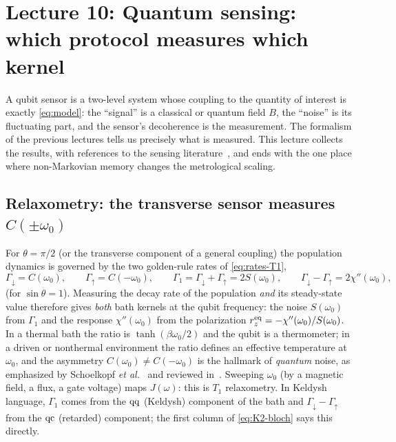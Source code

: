 \section{Lecture 10: Quantum sensing: which protocol measures which kernel}
\label{sec:lec10}

A qubit sensor is a two-level system whose coupling to the quantity of interest is exactly \cref{eq:model}: the ``signal'' is a classical or quantum field $B$, the ``noise'' is its fluctuating part, and the sensor's decoherence is the measurement.
The formalism of the previous lectures tells us precisely what is measured.
This lecture collects the results, with references to the sensing literature~\cite{Degen2017}, and ends with the one place where non-Markovian memory changes the metrological scaling.

\subsection{Relaxometry: the transverse sensor measures \texorpdfstring{$C(\pm\omega_0)$}{C(+-omega0)}}

For $\theta=\pi/2$ (or the transverse component of a general coupling) the population dynamics is governed by the two golden-rule rates of \cref{eq:rates-T1},
\begin{equation}
  \Gamma_\downarrow=C(\omega_0),\qquad \Gamma_\uparrow=C(-\omega_0),\qquad
  \Gamma_1=\Gamma_\downarrow+\Gamma_\uparrow=2S(\omega_0),\qquad
  \Gamma_\downarrow-\Gamma_\uparrow=2\chi''(\omega_0),
\end{equation}
(for $\sin\theta=1$).
Measuring the decay rate of the population \emph{and} its steady-state value therefore gives \emph{both} bath kernels at the qubit frequency: the noise $S(\omega_0)$ from $\Gamma_1$ and the response $\chi''(\omega_0)$ from the polarization $r_z^{\rm eq}=-\chi''(\omega_0)/S(\omega_0)$.
In a thermal bath the ratio is $\tanh(\beta\omega_0/2)$ and the qubit is a thermometer; in a driven or nonthermal environment the ratio defines an effective temperature at $\omega_0$, and the asymmetry $C(\omega_0)\ne C(-\omega_0)$ is the hallmark of \emph{quantum} noise, as emphasized by Schoelkopf \emph{et al.}~\cite{SchoelkopfClerk2003} and reviewed in~\cite[Sec.~II.B]{ClerkRMP2010}.
Sweeping $\omega_0$ (by a magnetic field, a flux, a gate voltage) maps $J(\omega)$: this is $T_1$ relaxometry.
In Keldysh language, $\Gamma_1$ comes from the $\mathrm{q}\mathrm{q}$ (Keldysh) component of the bath and $\Gamma_\downarrow-\Gamma_\uparrow$ from the $\mathrm{q}\mathrm{c}$ (retarded) component; the first column of \cref{eq:K2-bloch} says this directly.

